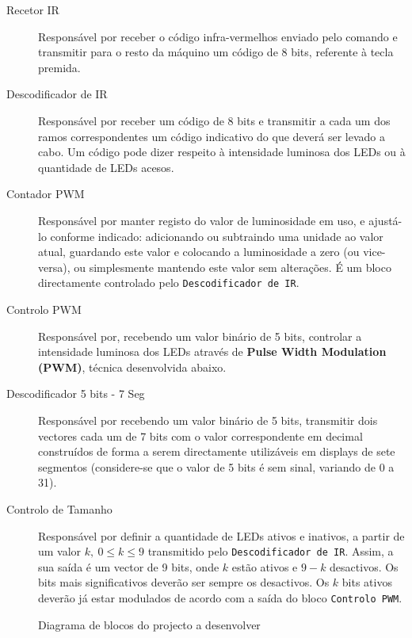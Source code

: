 \documentclass[a4paper,11pt,openright,oneside]{report}
\begin{document}
\begin{description}
\item[Recetor IR] Responsável por receber o código infra-vermelhos enviado pelo comando e transmitir para o resto da máquino um código de 8 bits, referente à tecla premida.
\item[Descodificador de IR] Responsável por receber um código de 8 bits e transmitir a cada um dos ramos correspondentes um código indicativo do que deverá ser levado a cabo. Um código pode dizer respeito à intensidade luminosa dos LEDs ou à quantidade de LEDs acesos.
\item[Contador PWM] Responsável por manter registo do valor de luminosidade em uso, e ajustá-lo conforme indicado: adicionando ou subtraindo uma unidade ao valor atual, guardando este valor e colocando a luminosidade a zero (ou vice-versa), ou simplesmente mantendo este valor sem alterações. É um bloco directamente controlado pelo \verb|Descodificador de IR|.
\item[Controlo PWM] Responsável por, recebendo um valor binário de 5 bits, controlar a intensidade luminosa dos LEDs através de \textbf{Pulse Width Modulation (PWM)}, técnica desenvolvida abaixo.
\item[Descodificador 5 bits - 7 Seg] Responsável por recebendo um valor binário de 5 bits, transmitir dois vectores cada um de 7 bits com o valor correspondente em decimal construídos de forma a serem directamente utilizáveis em displays de sete segmentos (considere-se que o valor de 5 bits é sem sinal, variando de 0 a 31).
\item[Controlo de Tamanho] Responsável por definir a quantidade de LEDs ativos e inativos, a partir de um valor $k,\ 0 \leq k \leq 9$ transmitido pelo \verb|Descodificador de IR|. Assim, a sua saída é um vector de 9 bits, onde $k$ estão ativos e $9 - k$ desactivos. Os bits mais significativos deverão ser sempre os desactivos. Os $k$ bits ativos deverão já estar modulados de acordo com a saída do bloco \verb|Controlo PWM|. 
\end{description}

\begin{figure}[ht]
\center
{}
\caption{Diagrama de blocos do projecto a desenvolver}
\label{fig:ir_leds2}
\end{figure}
\end{document}
